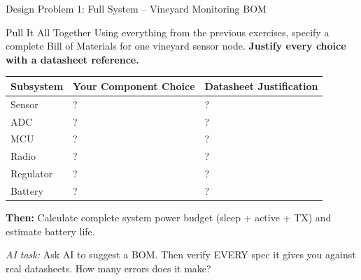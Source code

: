 \documentclass[aspectratio=169,11pt]{beamer}
\begin{document}
\begin{frame}{Design Problem 1: Full System -- Vineyard Monitoring BOM}
    \begin{block}{Pull It All Together}
        Using everything from the previous exercises, specify a complete Bill of Materials for one vineyard sensor node. \textbf{Justify every choice with a datasheet reference.}
        
        \vspace{0.2cm}
        \begin{center}
        \begin{tabular}{lll}
            \toprule
            \textbf{Subsystem} & \textbf{Your Component Choice} & \textbf{Datasheet Justification} \\
            \midrule
            Sensor & ? & ? \\
            ADC & ? & ? \\
            MCU & ? & ? \\
            Radio & ? & ? \\
            Regulator & ? & ? \\
            Battery & ? & ? \\
            \bottomrule
        \end{tabular}
        \end{center}
        
        \vspace{0.2cm}
        \textbf{Then:} Calculate complete system power budget (sleep + active + TX) and estimate battery life.
    \end{block}
    
    {\footnotesize \textit{AI task:} Ask AI to suggest a BOM. Then verify EVERY spec it gives you against real datasheets. How many errors does it make?}
\end{frame}
\end{document}
